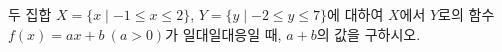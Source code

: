 \hspace*{2mm}\begin{minipage}[t]{\dimexpr\linewidth-2mm\relax}\vspace{0pt}
두 집합 $X=\{x\mid -1\le x\le 2\}$, $Y=\{y\mid -2\le y\le 7\}$에 대하여 $X$에서 $Y$로의 함수 $f(x)=ax+b\ (a>0)$가 일대일대응일 때, $a+b$의 값을 구하시오. \end{minipage}
